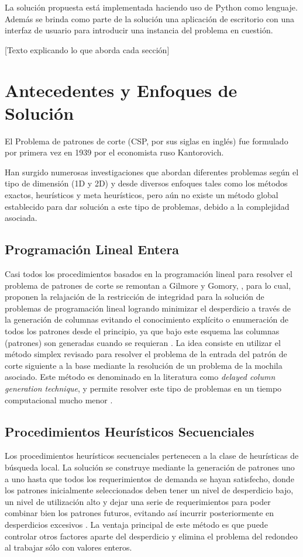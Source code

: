 \documentclass[a4paper,10pt,twocolumn]{article}
\begin{document}
La solución propuesta está implementada haciendo uso de Python como lenguaje. Además se brinda como parte de la solución una aplicación de escritorio con una interfaz de usuario para introducir una instancia del problema en cuestión. 

[Texto explicando lo que aborda cada sección]


\section{Antecedentes y Enfoques de Solución}
El Problema de patrones de corte (CSP, por sus siglas
en inglés) fue formulado por primera vez en 1939
por el economista ruso Kantorovich.

Han surgido numerosas investigaciones que abordan
diferentes problemas según el tipo de dimensión (1D y
2D) y desde diversos enfoques tales como los métodos
exactos, heurísticos y meta heurísticos, pero aún no
existe un método global establecido para dar solución
a este tipo de problemas, debido a la complejidad
asociada. 

\subsection{Programación Lineal Entera}

Casi todos los procedimientos basados en la
programación lineal para resolver el problema de
patrones de corte se remontan a Gilmore y Gomory,
\cite{1}, para lo cual, proponen la relajación de la restricción
de integridad para la solución de problemas de
programación lineal logrando minimizar el desperdicio
a través de la generación de columnas evitando el
conocimiento explícito o enumeración de todos los
patrones desde el principio, ya que bajo este esquema
las columnas (patrones) son generadas cuando se
requieran \cite{2}. La idea consiste en utilizar el método
simplex revisado para resolver el problema de la entrada
del patrón de corte siguiente a la base mediante la
resolución de un problema de la mochila asociado. Este
método es denominado en la literatura como \textit{delayed
column generation technique}, y permite resolver este
tipo de problemas en un tiempo computacional mucho
menor \cite{3}.


\subsection{Procedimientos Heurísticos Secuenciales}
Los procedimientos heurísticos secuenciales pertenecen
a la clase de heurísticas de búsqueda local. La solución
se construye mediante la generación de patrones uno
a uno hasta que todos los requerimientos de demanda
se hayan satisfecho, donde los patrones inicialmente
seleccionados deben tener un nivel de desperdicio
bajo, un nivel de utilización alto y dejar una serie de requerimientos para poder combinar bien los patrones
futuros, evitando así incurrir posteriormente en
desperdicios excesivos \cite{3}. La ventaja principal de este método es que puede controlar otros factores aparte del desperdicio y elimina
el problema del redondeo al trabajar sólo con valores
enteros.
\end{document}
